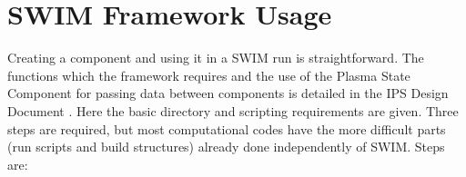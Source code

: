 \section{SWIM Framework Usage}
\label{sec:usage}

% 
% 
% 
% 
% 
% 

Creating a component and using it in a SWIM run is straightforward.
The functions which the framework requires and the use of the Plasma State
Component for passing data between components is detailed
in the IPS Design Document \cite{IPSdoc}. Here the basic directory and scripting
requirements are given.  Three steps are required, but most
computational codes have the more difficult parts (run scripts and build
structures) already done independently of SWIM. Steps are:


